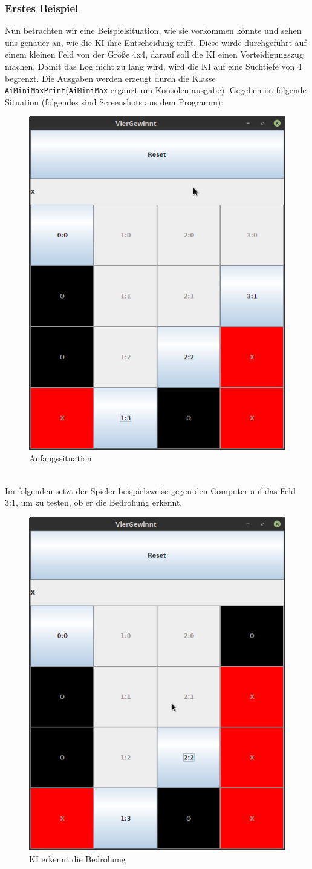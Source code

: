 \documentclass[12pt,a4paper]{article}
\def\code#1{\texttt{#1}}
\begin{document}
	\subsubsection{Erstes Beispiel}
	Nun betrachten wir eine Beispielsituation, wie sie vorkommen könnte und sehen uns genauer an, wie die KI ihre Entscheidung trifft. Diese wirde durchgeführt auf einem kleinen Feld von der Größe 4x4, darauf soll die KI einen Verteidigungszug machen. Damit das Log nicht zu lang wird, wird die KI auf eine Suchtiefe von 4 begrenzt. Die Ausgaben werden erzeugt durch die Klasse \code{AiMiniMaxPrint}(\code{AiMiniMax} ergänzt um Konsolen-ausgabe).
	Gegeben ist folgende Situation (folgendes sind Screenshots aus dem Programm):
\begin{figure}[h]
	\centering
	\includegraphics[width=0.5\linewidth, height=0.4\textheight]{maybe/fach0}
	\caption{Anfangssituation}
	\label{fig:fach0}
\end{figure}
	\\Im folgenden setzt der Spieler beispielsweise gegen den Computer auf das Feld 3:1, um zu testen, ob er die Bedrohung erkennt.
\begin{figure}[h]
	\centering
	\includegraphics[width=0.5\linewidth, height=0.4\textheight]{maybe/fach1}
	\caption{KI erkennt die Bedrohung}
	\label{fig:fach1}
\end{figure}
\end{document}
